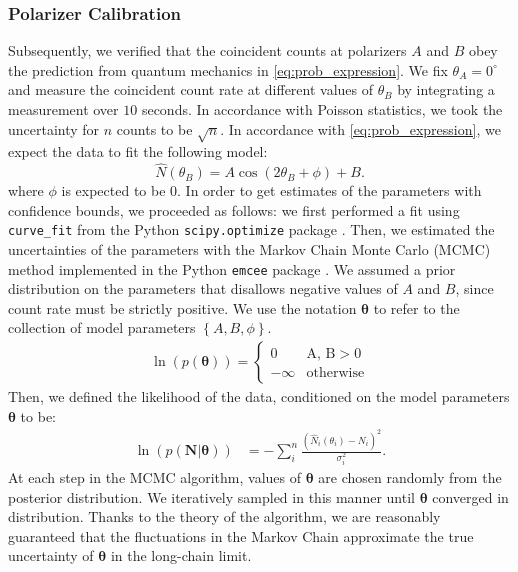 \documentclass[letter,scriptaddress,twocolumn, prl, nofootinbib]{revtex4}
\newcommand{\set}[1]{\left\{ #1 \right\}}
\begin{document}
\subsubsection{Polarizer Calibration}\label{subsubsec:polarizer_axes}
Subsequently, we verified that the coincident counts at polarizers $A$ and $B$ obey the prediction from quantum mechanics in \autoref{eq:prob_expression}. We fix $\theta_A = 0^\circ$ and measure the coincident count rate at different values of $\theta_B$ by integrating a measurement over $10$ seconds. In accordance with Poisson statistics, we took the uncertainty for $n$ counts to be $\sqrt{n}$. In accordance with \autoref{eq:prob_expression}, we expect the data to fit the following model:
\begin{equation} \label{eq:correlation}
    \hat{N}(\theta_B)=A\cos\left(2\theta_B + \phi\right) + B.
\end{equation}
where  $\phi$ is expected to be $0$.
In order to get estimates of the parameters with confidence bounds, we proceeded as follows: we first performed a fit using \texttt{curve\_fit} from the Python \texttt{scipy.optimize} package \cite{virtanen_scipy_2020}. Then, we estimated the uncertainties of the parameters with the Markov Chain Monte Carlo (MCMC) method implemented in the Python \texttt{emcee} package \cite{foreman-mackey_emcee_2013}. We assumed a prior distribution on the parameters that disallows negative values of $A$ and $B$, since count rate must be strictly positive. We use the notation $\boldsymbol{\theta}$ to refer to the collection of model parameters $\set{A, B, \phi}$.
\begin{equation}\label{eq:mod_prior}
\begin{matrix}
    \ln(p(\boldsymbol{\theta})) = \begin{cases}
        0 & \text{A, B} > 0 \\
        -\infty & \text{otherwise}
    \end{cases}
\end{matrix}
\end{equation}
Then, we defined the likelihood of the data, conditioned on the model parameters $\boldsymbol{\theta}$ to be:
\begin{align}
    \ln(p(\mathbf{N} | \boldsymbol{\theta}))&= -\sum_i^n\frac{(\hat{N}_i(\theta_i)-N_i)^2}{\sigma_{i}^2}.
\end{align}
At each step in the MCMC algorithm, values of $\boldsymbol{\theta}$ are chosen randomly from the posterior distribution. We iteratively sampled in this manner until $\boldsymbol{\theta}$ converged in distribution. Thanks to the theory of the algorithm, we are reasonably guaranteed that the fluctuations in the Markov Chain approximate the true uncertainty of $\boldsymbol{\theta}$ in the long-chain limit.
\end{document}
